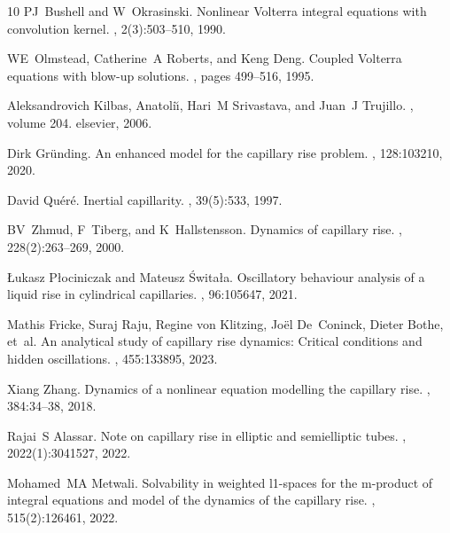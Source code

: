 \documentclass[12pt,a4paper]{article}
\begin{document}
\begin{thebibliography}{10}
	PJ~Bushell and W~Okrasinski.
	\newblock Nonlinear {V}olterra integral equations with convolution kernel.
	, 2(3):503--510,
	1990.
	
	WE~Olmstead, Catherine~A Roberts, and Keng Deng.
	\newblock Coupled {V}olterra equations with blow-up solutions.
	, pages
	499--516, 1995.
	
	Aleksandrovich Kilbas, Anatoli{\u\i}, Hari~M Srivastava, and Juan~J Trujillo.
	,
	volume 204.
	\newblock elsevier, 2006.
	
	Dirk Gr{\"u}nding.
	\newblock An enhanced model for the capillary rise problem.
	, 128:103210, 2020.
	
	David Qu{\'e}r{\'e}.
	\newblock Inertial capillarity.
	, 39(5):533, 1997.
	
	BV~Zhmud, F~Tiberg, and K~Hallstensson.
	\newblock Dynamics of capillary rise.
	, 228(2):263--269,
	2000.
	
	{\L}ukasz P{\l}ociniczak and Mateusz {\'S}wita{\l}a.
	\newblock Oscillatory behaviour analysis of a liquid rise in cylindrical
	capillaries.
	,
	96:105647, 2021.
	
	Mathis Fricke, Suraj Raju, Regine von Klitzing, Jo{\"e}l De~Coninck, Dieter
	Bothe, et~al.
	\newblock An analytical study of capillary rise dynamics: Critical conditions
	and hidden oscillations.
	, 455:133895, 2023.
	
	Xiang Zhang.
	\newblock Dynamics of a nonlinear equation modelling the capillary rise.
	, 384:34--38, 2018.
	
	Rajai~S Alassar.
	\newblock Note on capillary rise in elliptic and semielliptic tubes.
	, 2022(1):3041527, 2022.
	
	Mohamed~MA Metwali.
	\newblock Solvability in weighted l1-spaces for the m-product of integral
	equations and model of the dynamics of the capillary rise.
	,
	515(2):126461, 2022.
	

\end{thebibliography}
\end{document}
